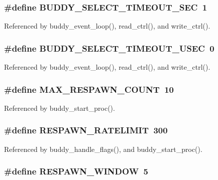 \subsubsection[{BUDDY\_\-SELECT\_\-TIMEOUT\_\-SEC}]{\setlength{\rightskip}{0pt plus 5cm}\#define BUDDY\_\-SELECT\_\-TIMEOUT\_\-SEC~1}\label{buddy_8c_a626b2fe03c7debfb60486ae00bf30ce1}


Referenced by buddy\_\-event\_\-loop(), read\_\-ctrl(), and write\_\-ctrl().

\subsubsection[{BUDDY\_\-SELECT\_\-TIMEOUT\_\-USEC}]{\setlength{\rightskip}{0pt plus 5cm}\#define BUDDY\_\-SELECT\_\-TIMEOUT\_\-USEC~0}\label{buddy_8c_a02e1de4ca64638af47b09371b68039e4}


Referenced by buddy\_\-event\_\-loop(), read\_\-ctrl(), and write\_\-ctrl().

\subsubsection[{MAX\_\-RESPAWN\_\-COUNT}]{\setlength{\rightskip}{0pt plus 5cm}\#define MAX\_\-RESPAWN\_\-COUNT~10}\label{buddy_8c_a3330b9685fba5fbf699f348210aca3d0}


Referenced by buddy\_\-start\_\-proc().

\subsubsection[{RESPAWN\_\-RATELIMIT}]{\setlength{\rightskip}{0pt plus 5cm}\#define RESPAWN\_\-RATELIMIT~300}\label{buddy_8c_adab61537d85775a79c1fb0492057d37e}


Referenced by buddy\_\-handle\_\-flags(), and buddy\_\-start\_\-proc().

\subsubsection[{RESPAWN\_\-WINDOW}]{\setlength{\rightskip}{0pt plus 5cm}\#define RESPAWN\_\-WINDOW~5}\label{buddy_8c_a8b0bab4747bb8d2312a23f4dab4ec48a}


